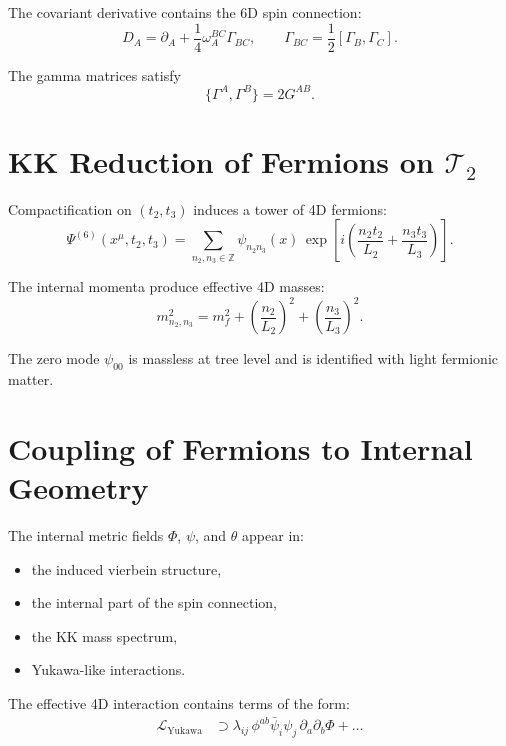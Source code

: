\documentclass[12pt]{article}
\begin{document}
The covariant derivative contains the 6D spin connection:
\[
D_A = \partial_A + \frac{1}{4}\omega_A^{BC}\Gamma_{BC},
\qquad
\Gamma_{BC}=\frac{1}{2}[\Gamma_B,\Gamma_C].
\]

The gamma matrices satisfy
\[
\{\Gamma^A,\Gamma^B\} = 2G^{AB}.
\]


\newpage
\section{KK Reduction of Fermions on \texorpdfstring{$\mathcal{T}_2$}{T2}}

Compactification on \((t_2,t_3)\) induces a tower of 4D fermions:
\begin{equation}
\Psi^{(6)}(x^\mu,t_2,t_3)
=
\sum_{n_2,n_3\in\mathbb{Z}}
\psi_{n_2 n_3}(x)\,
\exp\!\left[
i\left(
\frac{n_2 t_2}{L_2} + \frac{n_3 t_3}{L_3}
\right)
\right].
\label{eq:fermion-KK}
\end{equation}

The internal momenta produce effective 4D masses:
\[
m_{n_2,n_3}^2 = m_f^2 + \left(\frac{n_2}{L_2}\right)^2 + \left(\frac{n_3}{L_3}\right)^2.
\]

The zero mode \(\psi_{00}\) is massless at tree level and is identified with
light fermionic matter.


\newpage
\section{Coupling of Fermions to Internal Geometry}

The internal metric fields \(\Phi\), \(\psi\), and \(\theta\) appear in:
\begin{itemize}
\item the induced vierbein structure,
\item the internal part of the spin connection,
\item the KK mass spectrum,
\item Yukawa-like interactions.
\end{itemize}

The effective 4D interaction contains terms of the form:
\begin{align}
\mathcal{L}_{\text{Yukawa}}
&\supset
\lambda_{ij}\,
\phi^{ab}
\bar{\psi}_i \psi_j\,
\partial_a\partial_b \Phi
+\dots
\end{align}
\end{document}
